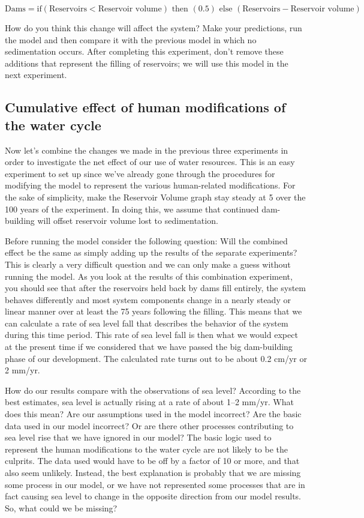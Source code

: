 \documentclass[11pt,letterpaper]{article}
\begin{document}
$$\mbox{Dams}=\mbox{if}(\mbox{Reservoirs}<\mbox{Reservoir volume})\mbox{ then }(0.5)\mbox{ else }(\mbox{Reservoirs}-\mbox{Reservoir volume})$$

How do you think this change will affect the system? Make your predictions, run the model and then compare it with the previous model in which no sedimentation occurs. After completing this experiment, don't remove these additions that represent the filling of reservoirs; we will use this model in the next experiment.

\subsection{Cumulative effect of human modifications of the water cycle}
Now let's combine the changes we made in the previous three experiments in order to investigate the net effect of our use of water resources. This is an easy experiment to set up since we've already gone through the procedures for modifying the model to represent the various human-related modifications. For the sake of simplicity, make the Reservoir Volume graph stay steady at 5 over the 100 years of the experiment. In doing this, we assume that continued dam-building will offset reservoir volume lost to sedimentation.

Before running the model consider the following question: Will the combined effect be the same as simply adding up the results of the separate experiments? This is clearly a very difficult question and we can only make a guess without running the model. As you look at the results of this combination experiment, you should see that after the reservoirs held back by dams fill entirely, the system behaves differently and most system components change in a nearly steady or linear manner over at least the 75 years following the filling. This means that we can calculate a rate of sea level fall that describes the behavior of the system during this time period. This rate of sea level fall is then what we would expect at the present time if we considered that we have passed the big dam-building phase of our development. The calculated rate turns out to be about 0.2 cm/yr or 2 mm/yr.

How do our results compare with the observations of sea level? According to the best estimates, sea level is actually rising at a rate of about 1--2 mm/yr. What does this mean? Are our assumptions used in the model incorrect? Are the basic data used in our model incorrect? Or are there other processes contributing to sea level rise that we have ignored in our model? The basic logic used to represent the human modifications to the water cycle are not likely to be the culprits. The data used would have to be off by a factor of 10 or more, and that also seem unlikely. Instead, the best explanation is probably that we are missing some process in our model, or we have not represented some processes that are in fact causing sea level to change in the opposite direction from our model results. So, what could we be missing? 
\end{document}
